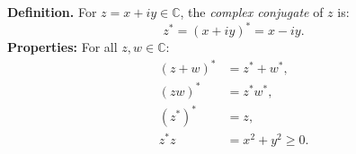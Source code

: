 \textbf{Definition.} For $z = x + iy \in \mathbb{C}$, the \textit{complex conjugate} of $z$ is:
\[
z^* = (x + iy)^* = x - iy.
\]
\textbf{Properties:} For all $z, w \in \mathbb{C}$:
\begin{align}
(z + w)^* &= z^* + w^*, \\
(zw)^* &= z^* w^*, \\
(z^*)^* &= z, \\
z^* z &= x^2 + y^2 \geq 0.
\end{align}
